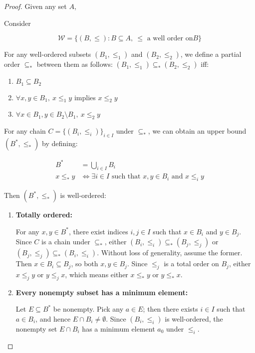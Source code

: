 \begin{proof}
    Given any set $A$,

    Consider

    \[
        \mathcal{W} = \{(B, \le): B \subseteq A,\: \le \text{ a well order on} B \}
    \]

    For any well-ordered subsets $(B_1, \le_1)$ and $(B_2, \le_2)$, we define a partial order $\subseteq_*$
    between them as follows: $(B_1, \le_1) \subseteq_* (B_2, \le_2)$ iff:

    \begin{enumerate}
        \item $B_1 \subseteq B_2$
        \item $\forall x,y \in B_1,\: x \le_1 y $ implies $x \le_2 y$
        \item $\forall x \in B_1, y \in B_2 \setminus B_1,\: x \le_2 y$
    \end{enumerate}

    For any chain $C = \{ (B_i, \le_i) \}_{i \in I}$ under $\subseteq_*$, we can obtain an upper bound $(B^*, \le_*)$ by defining:

    \begin{align*}
        B^* &= \bigcup_{i \in I} B_i \\
        x \le_* y &\iff \exists i \in I \text{ such that } x,y \in B_i \text{ and } x \le_i y
    \end{align*}

    Then $(B^*, \le_*)$ is well-ordered: 

    \begin{enumerate}
        \item \textbf{Totally ordered:} 
        
        For any $x,y \in B^*$, there exist indices $i, j \in I$ such that $x \in B_i$ and $y \in B_j$. 
        Since $C$ is a chain under $\subseteq_*$, either $(B_i, \le_i) \subseteq_* (B_j, \le_j)$ or 
        $(B_j, \le_j) \subseteq_* (B_i, \le_i)$. Without loss of generality, assume the former. 
        Then $x \in B_i \subseteq B_j$, so both $x, y \in B_j$. Since $\le_j$ is a total order on $B_j$, 
        either $x \le_j y$ or $y \le_j x$, which means either $x \le_* y$ or $y \le_* x$.

        \item \textbf{Every nonempty subset has a minimum element:} 
        
        Let $E \subseteq B^*$ be nonempty. Pick any $a \in E$; then there exists $i \in I$ such that $a \in B_i$, 
        and hence $E \cap B_i \neq \emptyset$. Since $(B_i, \le_i)$ is well-ordered, the nonempty set $E \cap B_i$ 
        has a minimum element $a_0$ under $\le_i$. 


\end{enumerate}
\end{proof}
